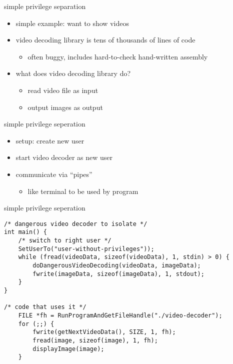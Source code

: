 
\begin{frame}{simple privilege separation}
    \begin{itemize}
    \item simple example: want to show videos
    \item video decoding library is tens of thousands of lines of code
        \begin{itemize}
        \item often buggy, includes hard-to-check hand-written assembly
        \end{itemize}
    \item what does video decoding library do?
        \begin{itemize}
        \item read video file as input
        \item output images as output
        \end{itemize}
    \end{itemize}
\end{frame}

\begin{frame}{simple privilege seperation}
    \begin{itemize}
    \item setup: create new user
    \item start video decoder as new user
    \item communicate via ``pipes''
        \begin{itemize}
        \item like terminal to be used by program
        \end{itemize}
    \end{itemize}
\end{frame}

\begin{frame}[fragile,label=privSepOutline]{simple privilege seperation}
    \vspace{-.5cm}
\begin{verbatim}
/* dangerous video decoder to isolate */
int main() {
    /* switch to right user */
    SetUserTo("user-without-privileges"));
    while (fread(videoData, sizeof(videoData), 1, stdin) > 0) {
        doDangerousVideoDecoding(videoData, imageData);
        fwrite(imageData, sizeof(imageData), 1, stdout);
    }
}

/* code that uses it */
    FILE *fh = RunProgramAndGetFileHandle("./video-decoder");
    for (;;) {
        fwrite(getNextVideoData(), SIZE, 1, fh);
        fread(image, sizeof(image), 1, fh);
        displayImage(image);
    }
\end{verbatim}
\end{frame}


